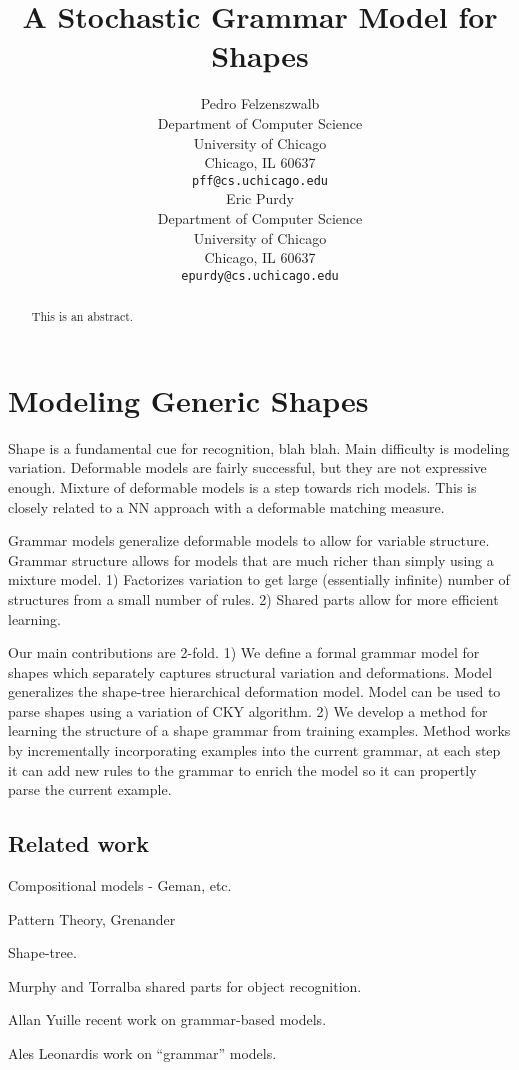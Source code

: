 \documentclass[10pt]{article}
\title{A Stochastic Grammar Model for Shapes}
\author{
Pedro Felzenszwalb\\
Department of Computer Science\\
University of Chicago\\
Chicago, IL 60637\\
\texttt{pff@cs.uchicago.edu}\\
\And
Eric Purdy\\
Department of Computer Science\\
University of Chicago\\
Chicago, IL 60637\\
\texttt{epurdy@cs.uchicago.edu}
}
\begin{document}
\maketitle

\begin{abstract}
This is an abstract.
\end{abstract}

\section{Modeling Generic Shapes}

Shape is a fundamental cue for recognition, blah blah.  Main
difficulty is modeling variation.  Deformable models are fairly
successful, but they are not expressive enough.  Mixture of deformable
models is a step towards rich models.  This is closely related to a NN
approach with a deformable matching measure.

Grammar models generalize deformable models to allow for variable
structure.  Grammar structure allows for models that are much richer
than simply using a mixture model.  1) Factorizes variation to get
large (essentially infinite) number of structures from a small number
of rules.  2) Shared parts allow for more efficient learning.

Our main contributions are 2-fold.  1) We define a formal grammar model for 
shapes which separately captures structural variation and deformations.  Model
generalizes the shape-tree hierarchical deformation model.  Model can be used
to parse shapes using a variation of CKY algorithm.  2) We develop a method
for learning the structure of a shape grammar from training examples.  Method
works by incrementally incorporating examples into the current grammar, at
each step it can add new rules to the grammar to enrich the model so it
can propertly parse the current example.

\subsection{Related work}

Compositional models - Geman, etc.

Pattern Theory, Grenander

Shape-tree.

Murphy and Torralba shared parts for object recognition.

Allan Yuille recent work on grammar-based models.

Ales Leonardis work on ``grammar'' models.
\end{document}
